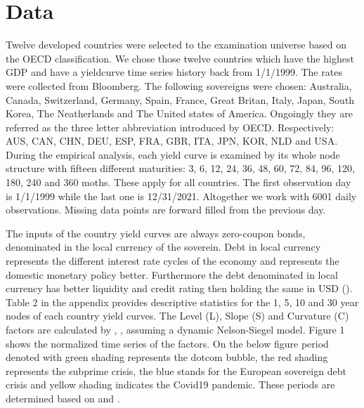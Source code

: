 \documentclass[12pt,bibliography=totoc]{article}
\begin{document}
\section{Data}

Twelve developed countries were selected to the examination universe based on the OECD classification. 
We chose those twelve countries which have the highest GDP and have a yieldcurve time series history back from 1/1/1999. 
The rates were collected from Bloomberg.
The following sovereigns were chosen: Australia, Canada, Switzerland, Germany, Spain, France, Great Britan, Italy, Japan, South Korea, The Neatherlands and The United states of America. 
Ongoingly they are referred as the three letter abbreviation introduced by OECD. 
Respectively:  AUS, CAN, CHN, DEU, ESP, FRA, GBR, ITA, JPN, KOR, NLD and USA. 
During the empirical analysis, each yield curve is examined by its whole node structure with fifteen different maturities: 3, 6, 12, 24, 36, 48, 60, 72, 84, 96, 120, 180, 240 and 360 moths. 
These apply for all countries. 
The first observation day is 1/1/1999 while the last one is 12/31/2021. 
Altogether we work with 6001 daily observations. 
Missing data points are forward filled from the previous day.

The inputs of the country yield curves are always zero-coupon bonds, denominated in the local currency of the soverein. 
Debt in local currency represents the different interest rate cycles of the economy and represents the domestic monetary policy better. 
Furthermore the debt denominated in local currency has better liquidity and credit rating then holding the same in USD  (\cite{sowmya2016linkages}). 
Table 2 in the appendix provides descriptive statistics for the 1, 5, 10 and 30 year nodes of each country yield curves. 
The Level (L), Slope (S) and Curvature (C) factors are calculated by \cite{diebold2006forecasting}, \cite{diebold2008global}, assuming a dynamic Nelson-Siegel model. 
Figure 1 shows the normalized time series of the factors. 
On the below figure period denoted with green shading represents the dotcom bubble, the red shading represents the subprime crisis, the blue stands for the European sovereign debt crisis and yellow shading indicates the Covid19 pandemic. 
These periods are determined based on \cite{bostanci2020connected} and \cite{hue2019measuring}.
\end{document}
